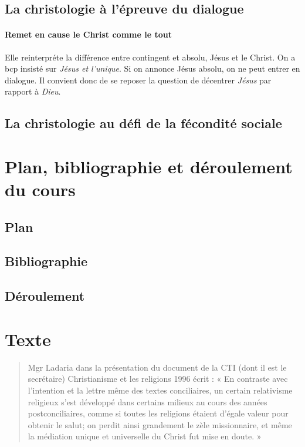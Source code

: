 \subsection{La christologie à l’épreuve du dialogue}

\paragraph{Remet en cause le Christ comme le tout} Elle reinterpréte la différence entre contingent et absolu, Jésus et le Christ. On a bcp insisté sur \textit{Jésus et l'unique}. Si on annonce Jésus absolu, on ne peut entrer en dialogue. Il convient donc de se reposer la question de décentrer \textit{Jésus} par rapport à \textit{Dieu}. 

\subsection{La christologie au défi de la fécondité sociale} 

\section{Plan, bibliographie et déroulement du cours}
\subsection{Plan}
 
\subsection{Bibliographie}
 
\subsection{Déroulement}


 \section{Texte}








\begin{quote}
    Mgr Ladaria dans la présentation du document de la CTI (dont il est le secrétaire)
Christianisme et les religions 1996 écrit : « En contraste avec l’intention et la lettre même des
textes conciliaires, un certain relativisme religieux s’est développé dans certains milieux au
cours des années postconciliaires, comme si toutes les religions étaient d’égale valeur pour
obtenir le salut; on perdit ainsi grandement le zèle missionnaire, et même la médiation unique
et universelle du Christ fut mise en doute. »
\end{quote}


